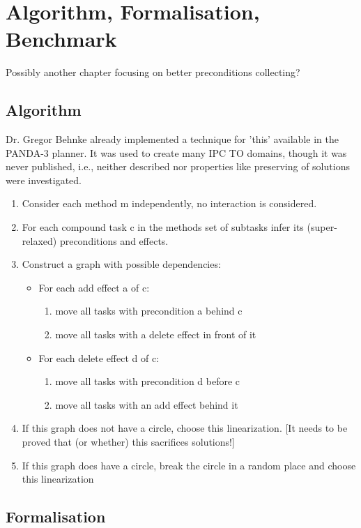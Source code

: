 \chapter{Algorithm, Formalisation, Benchmark}\label{chap:content}
\large{Possibly another chapter focusing on better preconditions collecting?}


\section{Algorithm}
Dr. Gregor Behnke already implemented a technique for 'this' available in the PANDA-3 planner. It was used to create many IPC TO domains, though it was never published, i.e., neither described nor properties like preserving of solutions were investigated.

\begin{enumerate}
	\item Consider each method m independently, no interaction is considered.
	\item For each compound task c in the methods set of subtasks infer its (super-relaxed) preconditions and effects. 
	\item Construct a graph with possible dependencies:  
	\begin{itemize}
		\item For each add effect a of c:
			\begin{enumerate} 
				\item move all tasks with precondition a behind c 
				\item move all tasks with a delete effect in front of it
			\end{enumerate}
		\item For each delete effect d of c:
			\begin{enumerate} 
				\item move all tasks with precondition d before c %
				\item move all tasks with an add effect behind it
			\end{enumerate}
	\end{itemize}
    \item If this graph does not have a circle, choose this linearization.  [It needs to be proved that (or whether) this sacrifices solutions!]
    \item If this graph does have a circle, break the circle in a random place and choose this linearization
\end{enumerate}


\section{Formalisation}


